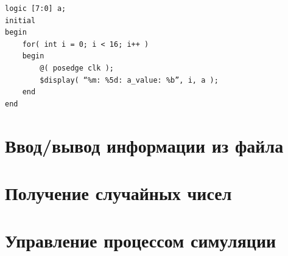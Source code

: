 \documentclass[a4paper,oneside ,10pt]{extreport}
\begin{document}
\begin{Verbatim}[tabsize=4]
logic [7:0] a;
initial
begin
	for( int i = 0; i < 16; i++ )
	begin
		@( posedge clk );
		$display( “%m: %5d: a_value: %b”, i, a ); 
	end
end
\end{Verbatim}

\section{Ввод/вывод информации из файла}

\section{Получение случайных чисел}

\section{Управление процессом симуляции}
\end{document}
